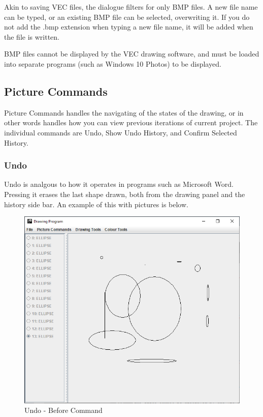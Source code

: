 \documentclass[12pt]{article} %
\begin{document}
Akin to saving VEC files, the dialogue filters for only BMP files. A new file name can be typed, or an existing BMP file can be selected, overwriting it. If you do not add the .bmp extension when typing a new file name, it will be added when the file is written. 

BMP files cannot be displayed by the VEC drawing software, and must be loaded into separate programs (such as Windows 10 Photos) to be displayed.

\subsection{Picture Commands}
Picture Commands handles the navigating of the states of the drawing, or in other words handles how you can view previous iterations of current project. The individual commands are Undo, Show Undo History, and Confirm Selected History.

\subsubsection{Undo}
Undo is analgous to how it operates in programs such as Microsoft Word. Pressing it erases the last shape drawn, both from the drawing panel and the history side bar. An example of this with pictures is below.

\begin{figure}[H]
\caption{Undo - Before Command}
\centering
\includegraphics[scale=0.75]{pictures/undoFirstWindow.PNG}
\end{figure}
\end{document}
